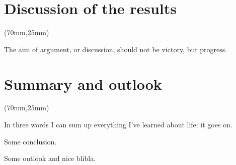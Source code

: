 

\chapter{Discussion of the results}
\label{chap:discussion}

\begin{textblock*}{.7\textwidth}(70mm,25mm)
    \begin{fquote}
        The aim of argument, or discussion, should not be victory, but progress.
    \end{fquote}
\end{textblock*}

\chapter{Summary and outlook}
\label{chap:summary}

\begin{textblock*}{.7\textwidth}(70mm,25mm)
    \begin{fquote}
        In three words I can sum up everything I've learned about life: it goes on.
    \end{fquote}
\end{textblock*}

Some conclusion.

Some outlook and nice blibla.